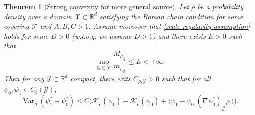 \documentclass[11pt, oneside, titlepage]{book}
\theoremstyle{plain}
\newtheorem{theorem}{Theorem}[chapter]
\theoremstyle{definition}
\newcommand{\R}{\mathbb{R}}
\newcommand{\K}{\mathcal{K}}
\newcommand{\X}{\mathcal{X}}
\newcommand{\Y}{\mathcal{Y}}
\newcommand{\F}{\mathcal{F}}
\DeclareMathOperator{\var}{Var}
\begin{document}
\begin{theorem}[Strong convexity for more general source]
\label{thrm: general strong convexity estimate}
Let $\rho$ be a probability density over a domain $\X \subset \R^d$ satisfying the Boman chain condition for some covering $\F$ and $A, B, C > 1$. Assume moreover that \eqref{scale regularity assumption} holds for some $D > 0$ (w.l.o.g. we assume $D > 1$) and there exists $E>0$ such that
\begin{equation}
\label{eq: uniform comparability of densities over cubes}
    \sup_{Q \in \F} \frac{M_{\rho_Q}}{m_{\rho_{Q}}} \leq E < +\infty.
\end{equation}
Then for any $\Y \subset \R^d$ compact, there exits $C_{\rho, \Y}>0$ such that for all $\psi_0, \psi_1 \in C_b(\Y)$,
\begin{equation}
\label{eq: strong inequality}
    \var_\rho(\psi_1^* - \psi_0^*) \leq C \bigg(\K_\rho(\psi_1) - \K_\rho(\psi_0) + \langle \psi_1 - \psi_0 | (\nabla\psi_0^*)_\# \rho\ \rangle \bigg).
\end{equation}
\end{theorem}
\end{document}
